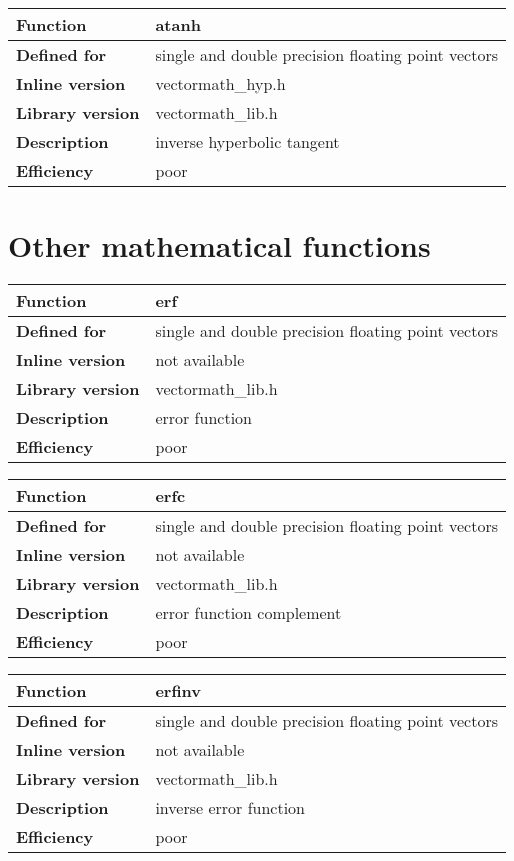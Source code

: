 \documentclass[vcl_manual.tex]{subfiles}
\begin{document}
\begin{tabular}{|p{30mm}|p{120mm}|}
\hline
\bfseries Function & atanh \\ \hline
\bfseries Defined for & single and double precision floating point vectors \\ \hline
\bfseries Inline version & vectormath\_hyp.h \\ \hline
\bfseries Library version & vectormath\_lib.h \\ \hline
\bfseries Description & inverse hyperbolic tangent \\ \hline
\bfseries Efficiency & poor \\ \hline
\end{tabular}


\section{Other mathematical functions}\label{OtherMathematicalFunctions}

\begin{tabular}{|p{30mm}|p{120mm}|}
\hline
\bfseries Function & erf \\ \hline
\bfseries Defined for & single and double precision floating point vectors \\ \hline
\bfseries Inline version & not available \\ \hline
\bfseries Library version & vectormath\_lib.h \\ \hline
\bfseries Description & error function \\ \hline
\bfseries Efficiency & poor \\ \hline
\end{tabular}


\begin{tabular}{|p{30mm}|p{120mm}|}
\hline
\bfseries Function & erfc \\ \hline
\bfseries Defined for & single and double precision floating point vectors \\ \hline
\bfseries Inline version & not available \\ \hline
\bfseries Library version & vectormath\_lib.h \\ \hline
\bfseries Description & error function complement \\ \hline
\bfseries Efficiency & poor \\ \hline
\end{tabular}


\begin{tabular}{|p{30mm}|p{120mm}|}
\hline
\bfseries Function & erfinv \\ \hline
\bfseries Defined for & single and double precision floating point vectors \\ \hline
\bfseries Inline version & not available \\ \hline
\bfseries Library version & vectormath\_lib.h \\ \hline
\bfseries Description & inverse error function \\ \hline
\bfseries Efficiency & poor \\ \hline
\end{tabular}
\end{document}
